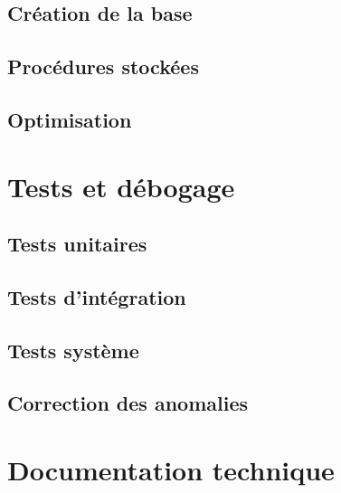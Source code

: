 
\subsection{Création de la base}


\subsection{Procédures stockées}


\subsection{Optimisation}


\section{Tests et débogage}


\subsection{Tests unitaires}


\subsection{Tests d'intégration}


\subsection{Tests système}


\subsection{Correction des anomalies}


\section{Documentation technique}

